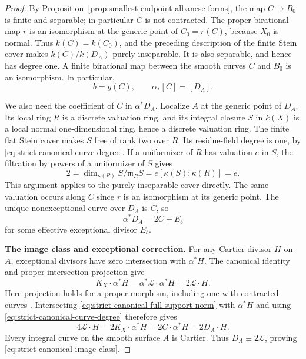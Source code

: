 \begin{proof}
By Proposition~\ref{prop:smallest-endpoint-albanese-forms},
the map $C\to B_0$ is finite and separable; in particular $C$
is not contracted.
The proper birational map $r$ is an isomorphism at the generic
point of $C_0=r(C)$, because $X_0$ is normal.
Thus $k(C)=k(C_0)$, and the preceding description of the finite
Stein cover makes $k(C)/k(D_A)$ purely inseparable.
It is also separable, and hence has degree one.
A finite birational map between the smooth curves $C$ and $B_0$
is an isomorphism.  In particular,
\begin{equation}\label{eq:strict-canonical-curve-degree}
 b=g(C),\qquad \alpha_*[C]=[D_A].
\end{equation}

We also need the coefficient of $C$ in $\alpha^*D_A$.
Localize $A$ at the generic point of $D_A$.
Its local ring $R$ is a discrete valuation ring, and its integral
closure $S$ in $k(X)$ is a local normal one-dimensional ring,
hence a discrete valuation ring.
The finite flat Stein cover makes $S$ free of rank two over $R$.
Its residue-field degree is one, by
\eqref{eq:strict-canonical-curve-degree}.
If a uniformizer of $R$ has valuation $e$ in $S$, the filtration
by powers of a uniformizer of $S$ gives
\[
 2=\dim_{\kappa(R)}S/\mathfrak m_RS
   =e[\kappa(S):\kappa(R)]=e.
\]
This argument applies to the purely inseparable cover directly.
The same valuation occurs along $C$ since $r$ is an isomorphism
at its generic point.
The unique nonexceptional curve over $D_A$ is $C$, so
\begin{equation}\label{eq:strict-canonical-image-initial-pullback}
 \alpha^*D_A=2C+E_b
\end{equation}
for some effective exceptional divisor $E_b$.

\par\smallskip\noindent\textbf{The image class and exceptional correction.}
For any Cartier divisor $H$ on $A$, exceptional divisors have
zero intersection with $\alpha^*H$.
The canonical identity and proper intersection projection give
\[
 K_X\cdot\alpha^*H
 =\alpha^*\mathcal L\cdot\alpha^*H
 =2\mathcal L\cdot H.
\]
Here projection holds for a proper morphism, including one
with contracted curves
\cite[Lemmas~42.26.3--42.26.4, Tags~02ST and~02SU]{Stacks}.
Intersecting \eqref{eq:strict-canonical-full-support-norm}
with $\alpha^*H$ and using
\eqref{eq:strict-canonical-curve-degree} therefore gives
\[
 4\mathcal L\cdot H
 =2K_X\cdot\alpha^*H
 =2C\cdot\alpha^*H
 =2D_A\cdot H.
\]
Every integral curve on the smooth surface $A$ is Cartier.
Thus $D_A\equiv2\mathcal L$, proving
\eqref{eq:strict-canonical-image-class}.


\end{proof}
